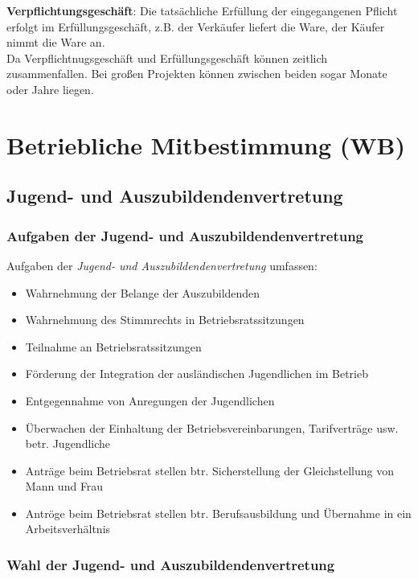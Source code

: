 \documentclass[a4paper, 12pt]{report}
\begin{document}
\textbf{Verpflichtungsgeschäft}: Die tatsächliche Erfüllung der eingegangenen
Pflicht erfolgt im Erfüllungsgeschäft, z.B. der Verkäufer liefert die Ware, 
der Käufer nimmt die Ware an. \\

Da Verpflichtnugsgeschäft und Erfüllungsgeschäft können zeitlich zusammenfallen. 
Bei großen Projekten können zwischen beiden sogar Monate oder Jahre liegen. 

\section{Betriebliche Mitbestimmung (WB)}

\subsection{Jugend- und Auszubildendenvertretung}

\subsubsection{Aufgaben der Jugend- und Auszubildendenvertretung}

Aufgaben der \emph{Jugend- und Auszubildendenvertretung} umfassen: 

\begin{itemize}
    \item Wahrnehmung der Belange der Auszubildenden 
    \item Wahrnehmung des Stimmrechts in Betriebsratssitzungen
    \item Teilnahme an Betriebsratssitzungen
    \item Förderung der Integration der ausländischen Jugendlichen im Betrieb
    \item Entgegennahme von Anregungen der Jugendlichen
    \item Überwachen der Einhaltung der Betriebsvereinbarungen, Tarifverträge
        usw. betr. Jugendliche
    \item Anträge beim Betriebsrat stellen btr. Sicherstellung der 
        Gleichstellung von Mann und Frau
    \item Antröge beim Betriebsrat stellen btr. Berufsausbildung und Übernahme 
        in ein Arbeitsverhältnis
\end{itemize}

\subsubsection{Wahl der Jugend- und Auszubildendenvertretung}
\end{document}
